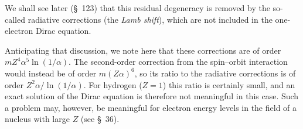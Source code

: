 We shall see later (\S~123) that this residual degeneracy is removed by the so-called radiative corrections (the \emph{Lamb shift}), which are not included in the one-electron Dirac equation.

Anticipating that discussion, we note here that these corrections are of order $mZ^4\alpha^5\ln(1/\alpha)$. The second-order correction from the spin--orbit interaction would instead be of order $m(Z\alpha)^6$, so its ratio to the radiative corrections is of order $Z^2\alpha/\ln(1/\alpha)$. For hydrogen ($Z=1$) this ratio is certainly small, and an exact solution of the Dirac equation is therefore not meaningful in this case. Such a problem may, however, be meaningful for electron energy levels in the field of a nucleus with large $Z$ (see \S~36).
